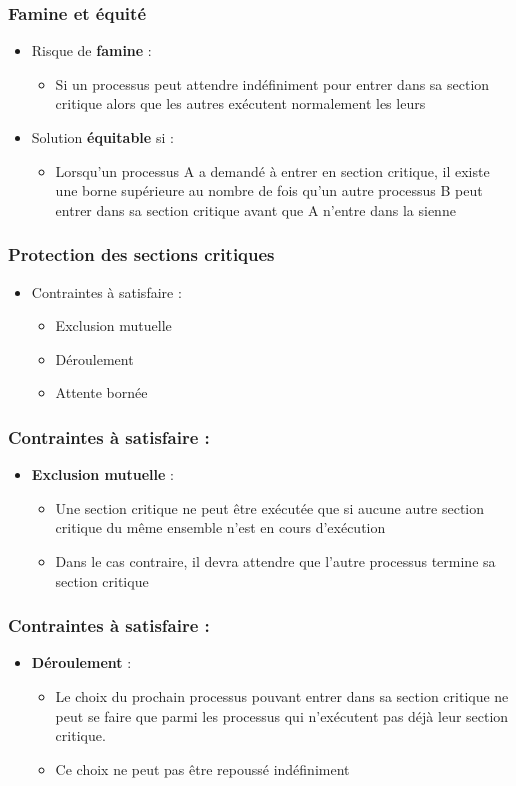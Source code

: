 \begin{frame}
\frametitle{Famine et équité}
\begin{itemize}
\item Risque de \textbf{famine} :
\begin{itemize}
\item Si un processus peut attendre indéfiniment pour entrer dans sa section critique alors que les autres exécutent normalement les leurs
\end{itemize}
\item Solution \textbf{équitable} si :
\begin{itemize}
\item Lorsqu'un processus A a demandé à entrer en section critique, il existe une borne supérieure au nombre de fois qu'un autre processus B peut entrer dans sa section critique avant que A n'entre dans la sienne
\end{itemize}
\end{itemize}
\end{frame}

\begin{frame}
\frametitle{Protection des sections critiques}
\begin{itemize}
\item Contraintes à satisfaire :
\begin{itemize}
\item Exclusion mutuelle
\item Déroulement
\item Attente bornée
\end{itemize}
\end{itemize}
\end{frame}

\begin{frame}
\frametitle{Contraintes à satisfaire :}
\begin{itemize}
\item \textbf{Exclusion mutuelle} :
\begin{itemize}
\item Une section critique ne peut être exécutée que si aucune autre section critique du même ensemble n'est en cours d'exécution
\item Dans le cas contraire, il devra attendre que l'autre processus termine sa section critique
\end{itemize}
\end{itemize}
\end{frame}

\begin{frame}
\frametitle{Contraintes à satisfaire :}
\begin{itemize}
\item \textbf{Déroulement} :
\begin{itemize}
\item Le choix du prochain processus pouvant entrer dans sa section critique ne peut se faire que parmi les processus qui n’exécutent pas déjà leur section critique.
\item Ce choix ne peut pas être repoussé indéfiniment
\end{itemize}
\end{itemize}
\end{frame}

